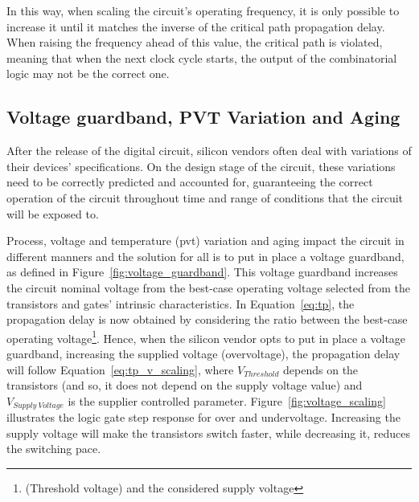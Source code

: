 In this way, when scaling the circuit's operating frequency, it is only possible to increase it until it matches the inverse of the critical path propagation delay. When raising the frequency ahead of this value, the critical path is violated, meaning that when the next clock cycle starts, the output of the combinatorial logic may not be the correct one.




\subsection{Voltage guardband, PVT Variation and Aging}

After the release of the digital circuit, silicon vendors often deal with variations of their devices' specifications. On the design stage of the circuit, these variations need to be correctly predicted and accounted for, guaranteeing the correct operation of the circuit throughout time and range of conditions that the circuit will be exposed to.

Process, voltage and temperature (\acrshort{pvt}) variation and aging impact the circuit in different manners and the solution for all is to put in place a voltage guardband, as defined in Figure~\ref{fig:voltage_guardband}. This voltage guardband increases the circuit nominal voltage from the best-case operating voltage selected from the transistors and gates' intrinsic characteristics.
In Equation~\ref{eq:tp}, the propagation delay is now obtained by considering the ratio between the best-case operating voltage\footnote{(Threshold voltage) and the considered supply voltage}. Hence, when the silicon vendor opts to put in place a voltage guardband, increasing the supplied voltage (overvoltage), the propagation delay will follow Equation~\ref{eq:tp_v_scaling}, where $V_{Threshold}$ depends on the transistors (and so, it does not depend on the supply voltage value) and $V_{Supply \: Voltage}$ is the supplier controlled parameter. Figure~\ref{fig:voltage_scaling} illustrates the logic gate step response for over and undervoltage. Increasing the supply voltage will make the transistors switch faster, while decreasing it, reduces the switching pace.



